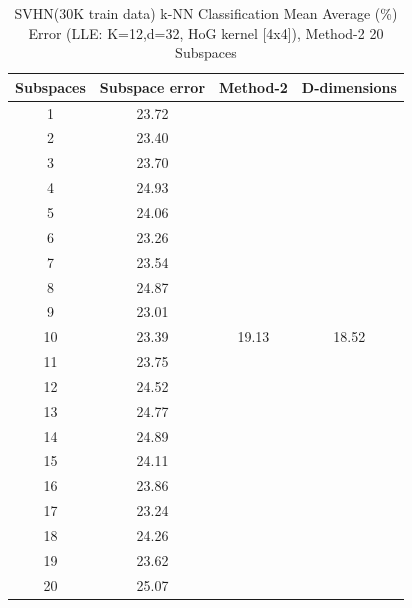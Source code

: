 \begin{table}[H]
\centering
\label{tab:table14}
\begin{tabular}{|c|c|c|c|}
\hline
\textlatin{Subspaces} & \textlatin{Subspace error} & \textlatin{Method-2} & \textlatin{D-dimensions}  \\
\hline
1 & 23.72 & & \\
2 & 23.40 & & \\
3 & 23.70 & & \\
4 & 24.93 & & \\
5 & 24.06 & & \\
6 & 23.26 & & \\
7 & 23.54 &  & \\
8 & 24.87 & & \\
9 & 23.01 &  & \\
10 & 23.39 & 19.13 & 18.52 \\
11 & 23.75 & & \\
12 & 24.52 &  & \\
13 & 24.77 &  & \\
14 & 24.89 & & \\
15 & 24.11 & & \\
16 & 23.86 & & \\
17 & 23.24 &  & \\
18 & 24.26 & & \\
19 & 23.62 &  & \\
20 & 25.07 &  & \\
\hline
\end{tabular}
\caption{\textlatin{SVHN(30K train data) k-NN Classification Mean Average (\%) Error (LLE: K=12,d=32, HoG kernel [4x4]), Method-2 20 Subspaces}}
\end{table}